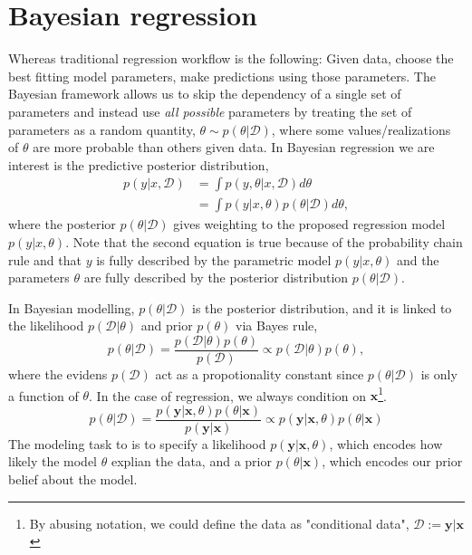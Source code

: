 \section{Bayesian regression}
Whereas traditional regression workflow is the following: Given data, choose the best fitting model
parameters, make predictions using those parameters. The Bayesian framework allows us to skip the
dependency of a single set of parameters and instead use \textit{all possible} parameters by treating the set
of parameters as a random quantity, $\theta \sim p(\theta|\mathcal{D})$, where some values/realizations of $\theta$ are more
probable than others given data. In Bayesian regression we are interest is the predictive posterior distribution,  
\begin{align}\label{Predictive2}
    p(y|x, \mathcal{D}) &= \int p(y,\theta|x, \mathcal{D}) d\theta\\
    &= \int p(y|x,\theta)p(\theta|\mathcal{D}) d\theta,
\end{align}
where the posterior $p(\theta|\mathcal{D})$ gives weighting to the proposed regression model
$p(y|x,\theta)$. Note that the second equation is true because of the probability chain rule and
that $y$ is fully described by the parametric model $p(y|x,\theta)$ and the parameters $\theta$ are
fully described by the posterior distribution $p(\theta|\mathcal{D})$.
\begin{testexample2}
    In Bayesian modelling, $p(\theta|\mathcal{D})$ is the posterior distribution, and it is linked
     to the likelihood $p(\mathcal{D}|\theta)$ and prior $p(\theta)$ via Bayes rule,
    $$p(\theta|\mathcal{D}) = \frac{p(\mathcal{D}|\theta)p(\theta)}{p(\mathcal{D})} \propto
    p(\mathcal{D}|\theta)p(\theta),$$ where the evidens $p(\mathcal{D})$ act as a propotionality
    constant since $p(\theta|\mathcal{D})$ is only a function of $\theta$. In the case of
    regression, we always condition on $\textbf{x}$\footnote{By abusing notation, we could define the
    data as "conditional data", $\mathcal{D} := \textbf{y}|\textbf{x}$}. 
    $$p(\theta| \mathcal{D}) = \frac{p(\textbf{y}|\textbf{x}, \theta)p(\theta|
    \textbf{x})}{p(\textbf{y}|\textbf{x})} \propto p(\textbf{y}|\textbf{x}, \theta)p(\theta| \textbf{x})$$
    The modeling task to is to specify a likelihood $p(\textbf{y}|\textbf{x},\theta)$, which encodes how likely the model $\theta$
    explian the data, and a prior $p(\theta|\textbf{x})$, which encodes our prior belief about the model. 
\end{testexample2}

